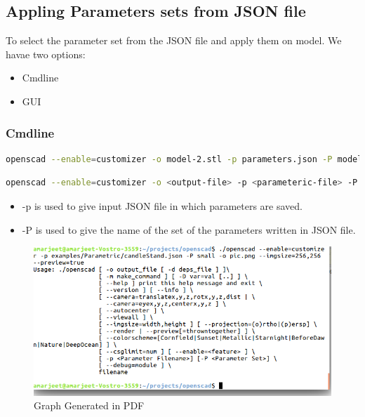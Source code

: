 \subsection{Appling Parameters sets from JSON file}
To select the parameter set from the JSON file and apply them on model. We havae two options:

\begin{itemize}
	\item Cmdline
	\item GUI
\end{itemize}

\subsubsection{Cmdline}
\begin{lstlisting}[language=bash]
openscad --enable=customizer -o model-2.stl -p parameters.json -P model-2 model.scad
\end{lstlisting}

\begin{lstlisting}[language=bash]
openscad --enable=customizer -o <output-file> -p <parameteric-file> -P <NameOfSet> <input-file SCAD file >\end{lstlisting}

\begin{itemize}
	\item -p is used to give input JSON file in which parameters are saved.
	\item -P is used to give the name of the set of the parameters written in JSON file.
\end{itemize}

\begin{figure}[H] 
	\centering \includegraphics[scale=0.31]{images/output/8.png}
	\caption{Graph Generated in PDF}
	\label{fig:7}
\end{figure}

